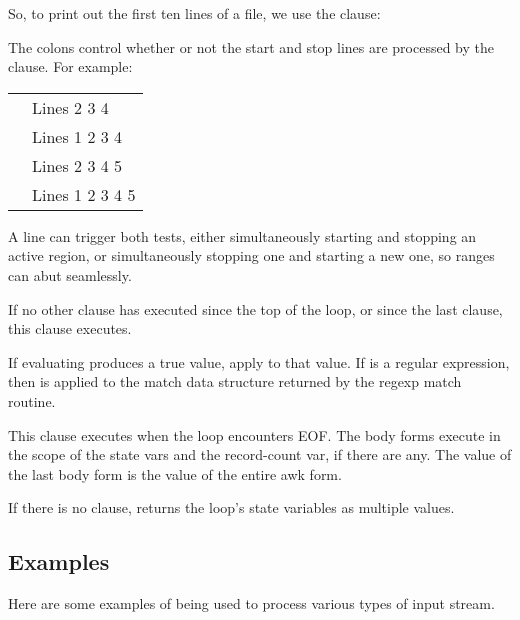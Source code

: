 \begin{code}
\begin{itemize}
        So, to print out the first ten lines of a file, we use the clause:

        The colons control whether or not the start and stop lines
        are processed by the clause. For example:
        \begin{inset}\begin{tabular}{l@{\qquad}l}
            \ex{(range\ \ \ 1 5\ \ \ldots)} &   Lines \phantom{1} 2 3 4 \\
            \ex{(:range\ \ 1 5\ \ \ldots)}  &   Lines 1 2 3 4           \\
            \ex{(range:\ \ 1 5\ \ \ldots)}  &   Lines \phantom{1} 2 3 4 5 \\
            \ex{(:range: 1 5\ \ \ldots)}    &   Lines 1 2 3 4 5
        \end{tabular}
        \end{inset}

        A line can trigger both tests, either simultaneously starting and
        stopping an active region, or simultaneously stopping one and starting
        a new one, so ranges can abut seamlessly.

        If no other clause has executed since the top of the loop, or
        since the last  clause, this clause executes.

        If evaluating  produces a true value, 
        apply  to that value.
        If  is a regular expression, then  is applied
        to the match data structure returned by the regexp match routine.

        This clause executes when the loop encounters EOF. The body forms
        execute in the scope of the state vars and the record-count var,
        if there are any. The value of the last body form is the value
        of the entire awk form.

        If there is no  clause,  returns the loop's state
        variables as multiple values.
\end{itemize}

\subsection{Examples}
Here are some examples of  being used to process various types
of input stream.


\end{code}

